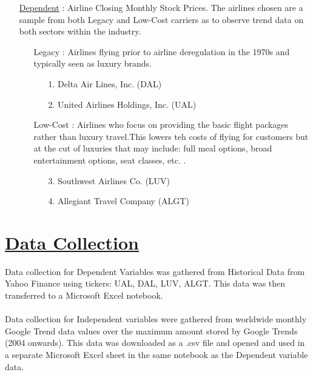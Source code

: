 \documentclass[12pt]{report}
\begin{document}
\begin{enumerate}
    \item[\underline{Dependent}]: Airline Closing Monthly Stock Prices.
    The airlines chosen are a sample from both Legacy and Low-Cost carriers as to observe trend data on both sectors within the industry.
    \begin{enumerate}
        \item[Legacy]: Airlines flying prior to airline deregulation in the 1970s and typically seen as luxury brands.
            \begin{enumerate}
                \item[1.]Delta Air Lines, Inc. (DAL)
                \item[2.]United Airlines Holdings, Inc. (UAL)
            \end{enumerate}
        \item[Low-Cost]: Airlines who focus on providing the basic flight packages rather than luxury travel.This lowers teh costs of flying for customers but at the cut of luxuries that may include: full meal options, broad entertainment options, seat classes, etc. .
            \begin{enumerate}
                \item[3.]Southwest Airlines Co. (LUV)
                \item[4.]Allegiant Travel Company (ALGT)
            \end{enumerate}
    \end{enumerate}


\end{enumerate}

\section*{\underline{Data Collection}}

Data collection for Dependent Variables was gathered from Historical Data from Yahoo Finance using tickers: UAL, DAL, LUV, ALGT. This data was then transferred to a Microsoft Excel notebook.
\\ \\
Data collection for Independent variables were gathered from worldwide monthly Google Trend data values over the maximum amount stored by Google Trends (2004 onwards).
This data was downloaded as a .csv file and opened and used in a separate Microsoft Excel sheet in the same notebook as the Dependent variable data.
\end{document}
